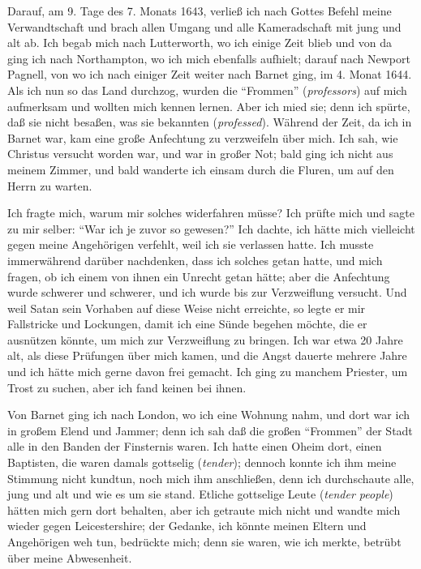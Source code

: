 Darauf, am 9. Tage des 7. Monats 1643, verließ ich nach
Gottes Befehl meine Verwandtschaft und brach allen Umgang und
alle Kameradschaft mit jung und alt ab. Ich begab mich nach
Lutterworth, wo ich einige Zeit blieb und von da ging ich nach
Northampton, wo ich mich ebenfalls aufhielt; darauf nach Newport 
Pagnell, von wo ich nach einiger Zeit weiter nach Barnet
ging, im 4. Monat 1644. Als ich nun so das Land durchzog,
wurden die "`Frommen"' (\textit{professors}) auf mich aufmerksam und
wollten mich kennen lernen. Aber ich mied sie; denn ich spürte,
daß sie nicht besaßen, was sie bekannten (\textit{professed}). Während
der Zeit, da ich in Barnet war, kam eine große Anfechtung zu
verzweifeln über mich. Ich sah, wie Christus versucht worden
war, und war in großer Not; bald ging ich nicht aus meinem
Zimmer, und bald wanderte ich einsam durch die Fluren, um auf
den Herrn zu warten.

Ich fragte mich, warum mir solches widerfahren müsse? Ich
prüfte mich und sagte zu mir selber: "`War ich je zuvor so gewesen?"' 
Ich dachte, ich hätte mich vielleicht gegen meine Angehörigen 
verfehlt, weil ich sie verlassen hatte. Ich musste immerwährend 
darüber nachdenken, dass ich solches getan hatte, und
mich fragen, ob ich einem von ihnen ein Unrecht getan hätte;
aber die Anfechtung wurde schwerer und schwerer, und ich wurde
bis zur Verzweiflung versucht. Und weil Satan sein Vorhaben
auf diese Weise nicht erreichte, so legte er mir Fallstricke und
Lockungen, damit ich eine Sünde begehen möchte, die er ausnützen 
könnte, um mich zur Verzweiflung zu bringen. Ich war
etwa 20 Jahre alt, als diese Prüfungen über mich kamen, und
die Angst dauerte mehrere Jahre und ich hätte mich gerne davon
frei gemacht. Ich ging zu manchem Priester, um Trost zu suchen,
aber ich fand keinen bei ihnen.

Von Barnet ging ich nach London, wo ich eine Wohnung nahm,
und dort war ich in großem Elend und Jammer; denn ich sah
daß die großen "`Frommen"' der Stadt alle in den Banden der
Finsternis waren. Ich hatte einen Oheim dort, einen Baptisten,
die waren damals gottselig (\textit{tender}); dennoch konnte ich ihm meine
Stimmung nicht kundtun, noch mich ihm anschließen, denn ich
durchschaute alle, jung und alt und wie es um sie stand. Etliche
gottselige Leute (\textit{tender people}) hätten mich gern dort behalten,
aber ich getraute mich nicht und wandte mich wieder gegen
Leicestershire; der Gedanke, ich könnte meinen Eltern und Angehörigen 
weh tun, bedrückte mich; denn sie waren, wie ich merkte,
betrübt über meine Abwesenheit.

